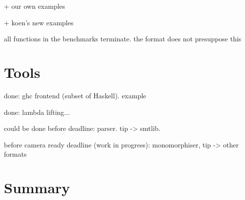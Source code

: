 \documentclass{llncs}
\begin{document}
+ our own examples

+ koen's new examples

all functions in the benchmarks terminate. the format does not presuppose this

\section{Tools}

done: ghc frontend (subset of Haskell). example

done: lambda lifting...

could be done before deadline: parser. tip -> smtlib.

before camera ready deadline (work in progress): monomorphiser, tip -> other formats

\section{Summary}



\end{document}
